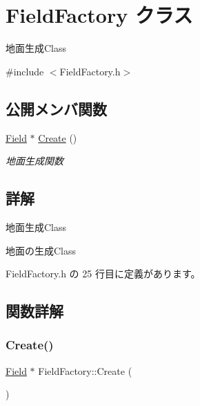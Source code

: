 \hypertarget{class_field_factory}{}\section{Field\+Factory クラス}
\label{class_field_factory}


地面生成\+Class  




{\ttfamily \#include $<$Field\+Factory.\+h$>$}

\subsection*{公開メンバ関数}
\begin{DoxyCompactItemize}
\item 
\mbox{\hyperlink{class_field}{Field}} $\ast$ \mbox{\hyperlink{class_field_factory_a0f55aa52584fb567c951f38bbfe34c05}{Create}} ()
\begin{DoxyCompactList}\small\item\em 地面生成関数 \end{DoxyCompactList}\end{DoxyCompactItemize}


\subsection{詳解}
地面生成\+Class 

地面の生成\+Class 

 Field\+Factory.\+h の 25 行目に定義があります。



\subsection{関数詳解}
\mbox{\label{class_field_factory_a0f55aa52584fb567c951f38bbfe34c05}} 
\subsubsection{\texorpdfstring{Create()}{Create()}}
{\footnotesize\ttfamily \mbox{\hyperlink{class_field}{Field}} $\ast$ Field\+Factory\+::\+Create (\begin{DoxyParamCaption}{ }\end{DoxyParamCaption})}



